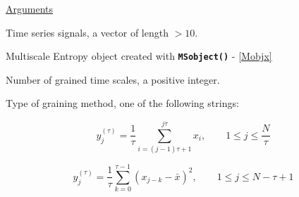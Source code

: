 \documentclass[12pt, a4paper, titlepage, openany]{book}
\begin{document}
\noindent \ul{Arguments}
\begin{description}[labelsep=1cm, labelwidth=2cm, nosep, style=multiline,leftmargin=3cm]\footnotesize
\item[\texttt{Sig}]		Time series signals, a vector of length $> 10$.
\item[\texttt{Mobj}]	Multiscale Entropy object created with \texttt{\textbf{MSobject()}} - \ref{Mobjx}
\item[\texttt{Scales}]		Number of grained time scales, a positive integer.
\item[\texttt{Methodx}]		Type of graining method, one of the following strings:
	\begin{description}[labelsep=8em, labelwidth=10em, nosep,style=multiline,leftmargin=3cm]
	\item[\texttt{"coarse"}]	\cite{MS1}
	\[y^{(\tau)}_{j} = \frac{1}{\tau} \sum^{j\tau}_{i=(j-1)\tau+1} x_{i},\qquad  1\leq j\leq \frac{N}{\tau}\] 
	
	\item[\texttt{"generalized"}]	\cite{MS12}
	\[y^{(\tau)}_{j} = \frac{1}{\tau} \sum^{\tau-1}_{k=0} (x_{j-k} - \bar{x})^2,	\qquad  1\leq j\leq N-\tau+1 \]	
	

\end{description}
\end{description}
\end{document}
